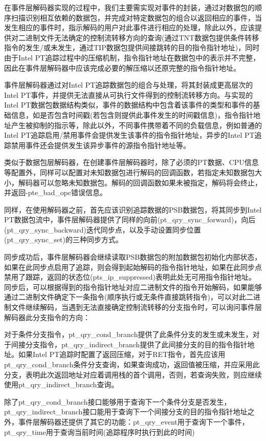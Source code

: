 在事件层解码器实现的过程中，我们主要需实现对事件的封装，通过对数据包的顺序扫描识别相互依赖的数据包，并完成对特定数据包的组合以返回相应的事件，当发生相应的事件时，指示解码的用户对此事件进行相应的处理，除此以外，应该提供对二进制文件无法确定的控制流转移方向的查询(通过TNT数据包提供条件转移指令的发生/或未发生，通过TIP数据包提供间接跳转的目的指令指针地址)，同时由于Intel PT追踪过程中的压缩机制，指令指针地址在数据包中的表示并不完整，因此在事件层解码器中应该完成必要的解压缩以还原完整的指令指针地址。

事件层解码器通过对Intel PT追踪数据包的组合与处理，将其封装成更高层次的Intel PT事件，并提供无法直接从可执行文件得到的控制流转移方向。与实现的Intel PT数据包数据结构类似，事件的数据结构中包含着该事件的类型和事件的基础信息，如是否包含时间戳(若包含则提供此事件发生的时间戳信息)，指令指针地址产生被抑制的指示等，除此以外，不同事件携带着不同的负载信息，例如普通的Intel PT追踪启用/禁用事件会提供发生该事件的指令指针地址，异步的Intel PT追踪禁用事件还会提供发生该异步事件的源指令指针地址等。

类似于数据包层解码器，在创建事件层解码器时，除了必须的PT数据、CPU信息等配置外，同样可以配置对未知数据包进行解码的回调函数，若指定未知数据包大小，解码器可以忽略未知数据包。解码的回调函数如果未被指定，解码将会终止，并返回-pte\_bad\_opc错误信息。

同样，在使用解码器之前，首先应该识别追踪数据的PSB数据包，将其同步到Intel PT数据包流中，事件层解码器提供了同样的向前(pt\_qry\_sync\_forward)，向后(pt\_qry\_sync\_backward)迭代同步点，以及手动设置同步位置(pt\_qry\_sync\_set)的三种同步方式。

同步成功后，事件层解码器会继续读取PSB数据包的附加数据包初始化内部状态，如果在此同步点启用了追踪，则会得到起始解码的指令指针地址，如果在此同步点禁用了跟踪，返回的状态位(pts\_ip\_suppressed)表明此处无可用指令指针地址。同步后，可以根据得到的指令指针地址对应二进制文件的指令开始解码，如果能够通过二进制文件确定下一条指令(顺序执行或无条件直接跳转指令)，可以对此二进制文件继续解码，当遇到无法直接确定控制流转移的分支指令时，可以询问事件层解码器此分支指令的方向：

对于条件分支指令，pt\_qry\_cond\_branch提供了此条件分支的发生或未发生，对于间接分支指令，pt\_qry\_indirect\_branch提供了此间接分支的目的指令指针地址。如果Intel PT追踪时配置了返回压缩，对于RET指令，首先应该用\\pt\_qry\_cond\_branch条件分支查询，如果查询成功，返回值被压缩，并应采用此分支，表明此次返回地址对应着调用栈的首个调用，否则，若查询失败，则应继续使用pt\_qry\_indirect\_branch查询。

除了pt\_qry\_cond\_branch接口能够用于查询下一个条件分支是否发生，\\pt\_qry\_indirect\_branch接口能用于查询下一个间接分支的目的指令指针地址之外，事件层解码器还提供了其它的功能：pt\_qry\_event用于查询下一个事件，pt\_qry\_time用于查询当前时间(追踪程序时执行到此的时间)

